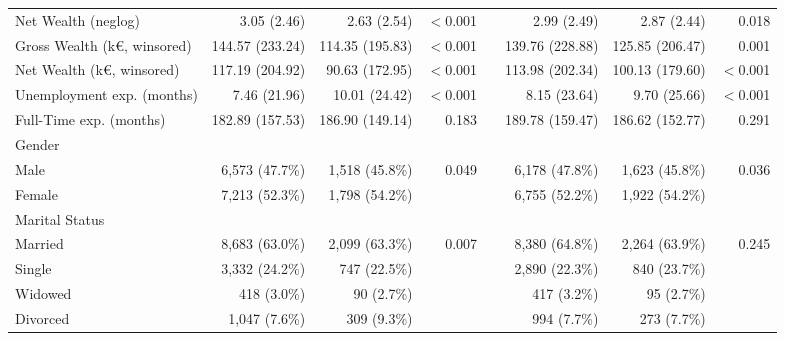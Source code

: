 {\begin{landscape}
\begin{table}
\begin{adjustbox}{max width=.8\linewidth}
\begin{threeparttable}
\begin{tabular}{l rrr c rrr}
                    Net Wealth (neglog)             & 3.05 (2.46)     & 2.63 (2.54)     & $<$0.001 &  & 2.99 (2.49)     & 2.87 (2.44)     & 0.018    \\
                    Gross Wealth (k€, winsored)     & 144.57 (233.24) & 114.35 (195.83) & $<$0.001 &  & 139.76 (228.88) & 125.85 (206.47) & 0.001    \\
                    Net Wealth (k€, winsored)       & 117.19 (204.92) & 90.63 (172.95)  & $<$0.001 &  & 113.98 (202.34) & 100.13 (179.60) & $<$0.001 \\
                    Unemployment exp. (months)      & 7.46 (21.96)    & 10.01 (24.42)   & $<$0.001 &  & 8.15 (23.64)    & 9.70 (25.66)    & $<$0.001 \\
                    Full-Time exp. (months)         & 182.89 (157.53) & 186.90 (149.14) & 0.183    &  & 189.78 (159.47) & 186.62 (152.77) & 0.291    \\
                    Gender                          &                 &                 &          &  &                 &                 &          \\
                    \hspace{1em}Male                & 6,573 (47.7\%)  & 1,518 (45.8\%)  & 0.049    &  & 6,178 (47.8\%)  & 1,623 (45.8\%)  & 0.036    \\
                    \hspace{1em}Female              & 7,213 (52.3\%)  & 1,798 (54.2\%)  &          &  & 6,755 (52.2\%)  & 1,922 (54.2\%)  &          \\
                    Marital Status                  &                 &                 &          &  &                 &                 &          \\
                    \hspace{1em}Married             & 8,683 (63.0\%)  & 2,099 (63.3\%)  & 0.007    &  & 8,380 (64.8\%)  & 2,264 (63.9\%)  & 0.245    \\
                    \hspace{1em}Single              & 3,332 (24.2\%)  & 747 (22.5\%)    &          &  & 2,890 (22.3\%)  & 840 (23.7\%)    &          \\
                    \hspace{1em}Widowed             & 418 (3.0\%)     & 90 (2.7\%)      &          &  & 417 (3.2\%)     & 95 (2.7\%)      &          \\
                    \hspace{1em}Divorced            & 1,047 (7.6\%)   & 309 (9.3\%)     &          &  & 994 (7.7\%)     & 273 (7.7\%)     &          \\

\end{tabular}
\end{threeparttable}
\end{adjustbox}
\end{table}
\end{landscape}}
